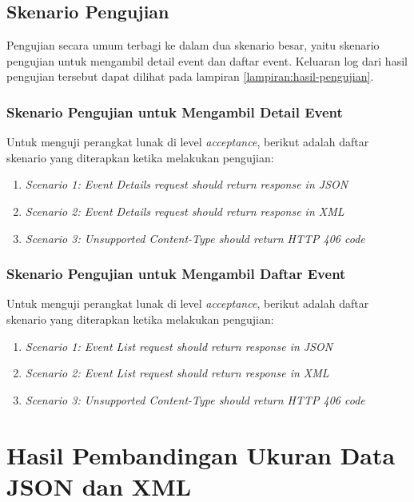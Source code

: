 \documentclass[a4paper, 12pt, oneside]{report}
\begin{document}
\subsection{Skenario Pengujian}

Pengujian secara umum terbagi ke dalam dua skenario besar, yaitu skenario pengujian untuk mengambil detail event dan daftar event. Keluaran log dari hasil pengujian tersebut dapat dilihat pada lampiran \ref{lampiran:hasil-pengujian}.

\subsubsection{Skenario Pengujian untuk Mengambil Detail Event}

Untuk menguji perangkat lunak di level \textit{acceptance}, berikut adalah daftar skenario yang diterapkan ketika melakukan pengujian:

\begin{enumerate}
  \item \textit{Scenario 1: Event Details request should return response in JSON}
  \item \textit{Scenario 2: Event Details request should return response in XML}
  \item \textit{Scenario 3: Unsupported Content-Type should return HTTP 406 code}
\end{enumerate}

\subsubsection{Skenario Pengujian untuk Mengambil Daftar Event}

Untuk menguji perangkat lunak di level \textit{acceptance}, berikut adalah daftar skenario yang diterapkan ketika melakukan pengujian:

\begin{enumerate}
  \item \textit{Scenario 1: Event List request should return response in JSON}
  \item \textit{Scenario 2: Event List request should return response in XML}
  \item \textit{Scenario 3: Unsupported Content-Type should return HTTP 406 code}
\end{enumerate}

\section{Hasil Pembandingan Ukuran Data JSON dan XML}
\end{document}
